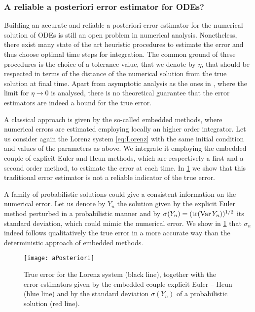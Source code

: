 \documentclass[final,onefignum,onetabnum]{siamonline171218}
\begin{document}
\subsubsection*{A reliable a posteriori error estimator for ODEs?} Building an accurate and reliable a posteriori error estimator for the numerical solution of ODEs is still an open problem in numerical analysis. Nonetheless, there exist many state of the art heuristic procedures to estimate the error and thus choose optimal time steps for integration. The common ground of these procedures is the choice of a tolerance value, that we denote by $\eta$, that should be respected in terms of the distance of the numerical solution from the true solution at final time. Apart from asymptotic analysis as the ones in \cite{HiS98, LaS98}, where the limit for $\eta \to 0$ is analysed, there is no theoretical guarantee that the error estimators are indeed a bound for the true error. 

A classical approach is given by the so-called embedded methods, where numerical errors are estimated employing locally an higher order integrator. Let us consider again the Lorenz system \eqref{eq:Lorenz} with the same initial condition and values of the parameters as above. We integrate it employing the embedded couple of explicit Euler and Heun methods, which are respectively a first and a second order method, to estimate the error at each time. In \cref{fig:aPosteriori} we show that this traditional error estimator is not a reliable indicator of the true error.

A family of probabilistic solutions could give a consistent information on the numerical error. Let us denote by $Y_n$ the solution given by the explicit Euler method perturbed in a probabilistic manner and by $\sigma(Y_n) = (\operatorname{tr}(\operatorname{Var} Y_n))^{1/2}$ its standard deviation, which could mimic the numerical error. We show in \cref{fig:aPosteriori} that $\sigma_n$ indeed follows qualitatively the true error in a more accurate way than the deterministic approach of embedded methods.

\begin{figure}
	\centering
	\texttt{[image: aPosteriori]}
	\caption{True error for the Lorenz system (black line), together with the error estimators given by the embedded couple explicit Euler -- Heun (blue line) and by the standard deviation $\sigma(Y_n)$ of a probabilistic solution (red line).}
	\label{fig:aPosteriori}
\end{figure}
\end{document}
